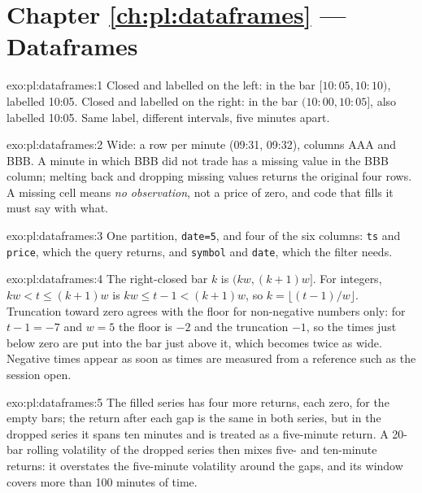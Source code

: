 \section*{Chapter \ref{ch:pl:dataframes} --- Dataframes}

\begin{solution}{exo:pl:dataframes:1}
Closed and labelled on the left: in the bar $[10\!:\!05, 10\!:\!10)$, labelled 10:05. Closed and labelled on the right: in the bar
$(10\!:\!00, 10\!:\!05]$, also labelled 10:05. Same label, different intervals, five minutes apart.
\end{solution}

\begin{solution}{exo:pl:dataframes:2}
Wide: a row per minute (09:31, 09:32), columns AAA and BBB. A minute in which BBB did not trade has a missing value in the BBB column;
melting back and dropping missing values returns the original four rows. A missing cell means \emph{no observation}, not a price of zero,
and code that fills it must say with what.
\end{solution}

\begin{solution}{exo:pl:dataframes:3}
One partition, \texttt{date=5}, and four of the six columns: \texttt{ts} and \texttt{price}, which the query returns, and \texttt{symbol}
and \texttt{date}, which the filter needs.
\end{solution}

\begin{solution}{exo:pl:dataframes:4}
The right-closed bar $k$ is $(kw, (k+1)w]$. For integers, $kw < t \le (k+1)w$ is $kw \le t-1 < (k+1)w$, so $k = \lfloor (t-1)/w \rfloor$.
Truncation toward zero agrees with the floor for non-negative numbers only: for $t - 1 = -7$ and $w = 5$ the floor is $-2$ and the
truncation $-1$, so the times just below zero are put into the bar just above it, which becomes twice as wide. Negative times appear as soon
as times are measured from a reference such as the session open.
\end{solution}

\begin{solution}{exo:pl:dataframes:5}
The filled series has four more returns, each zero, for the empty bars; the return after each gap is the same in both series, but in the
dropped series it spans ten minutes and is treated as a five-minute return. A 20-bar rolling volatility of the dropped series then mixes
five- and ten-minute returns: it overstates the five-minute volatility around the gaps, and its window covers more than 100 minutes of time.
\end{solution}

